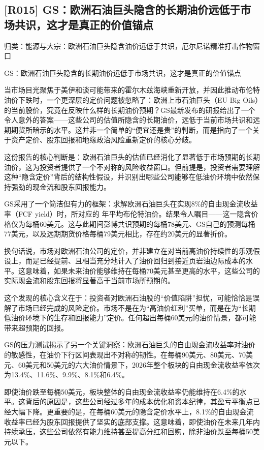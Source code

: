 \documentclass[11pt]{ctexart}
\begin{document}
\subsection{[R015] GS：欧洲石油巨头隐含的长期油价远低于市场共识，这才是真正的价值锚点}
{\small\color{refgray}归类：能源与大宗：欧洲石油巨头隐含油价远低于共识，厄尔尼诺精准打击作物窗口}

GS：欧洲石油巨头隐含的长期油价远低于市场共识，这才是真正的价值锚点

当市场目光聚焦于美伊和谈可能带来的霍尔木兹海峡重新开放，并因此推动布伦特油价下跌时，一个更深层的定价问题被忽略了：欧洲上市石油巨头（EU Big Oils）的当前股价，究竟在反映什么样的长期油价预期？GS最新发布的研报给出了一个令人意外的答案——这些公司的估值所隐含的长期油价，远低于当前市场共识和远期期货所暗示的水平。这并非一个简单的“便宜还是贵”的判断，而是指向了一个关于资产定价、股东回报和地缘政治风险重新定价的核心分歧。

这份报告的核心判断是：欧洲石油巨头的估值已经消化了显著低于市场预期的长期油价，这为投资者提供了一个不对称的风险收益窗口。但前提是，投资者需要理解这种“隐含定价”背后的结构性假设，并识别出哪些公司能够在低油价环境中依然保持强劲的现金流和股东回报能力。

GS采用了一个简洁但有力的框架：求解欧洲石油巨头在实现8\%的自由现金流收益率（FCF yield）时，所对应的 年平均布伦特油价。结果令人瞩目——这一隐含价格仅为每桶60美元。这与此期间彭博共识预期的每桶78美元、GS自己的预测每桶77美元，以及远期期货价格每桶79美元相比，存在约20美元的显著折价。

换句话说，市场对欧洲石油公司的定价，并非建立在对当前高油价持续性的乐观假设上，而是已经提前、且相当充分地计入了油价回归到接近页岩油边际成本的水平。这意味着，如果未来油价能够维持在每桶70美元甚至更高的水平，这些公司的实际现金流和股东回报将显著高于当前市场所预期的。

这个发现的核心含义在于：投资者对欧洲石油股的“价值陷阱”担忧，可能恰恰是误解了市场已经完成的风险定价。市场不是在为“高油价红利”买单，而是在为“长期低油价环境下的生存和回报能力”定价。任何超出每桶60美元的油价情景，都可能带来超预期的回报。

GS的压力测试揭示了另一个关键洞察：欧洲石油巨头的自由现金流收益率对油价的敏感性，在油价下行区间表现出不对称的韧性。在每桶90美元、80美元、70美元、60美元和50美元的六大油价情景下，2026年整个板块的自由现金流收益率依次为13.4\%、11.6\%、9.9\%、8.1\%和6.4\%。

即使油价跌至每桶50美元，板块整体的自由现金流收益率仍能维持在6.4\%的水平。这背后的原因是，这些公司经过多年的成本优化和资本纪律，其盈亏平衡点已经大幅下降。更重要的是，在每桶60美元的隐含定价水平上，8.1\%的自由现金流收益率已经为股东回报提供了坚实的底部支撑。这意味着，即使油价在未来几年内持续承压，这些公司依然有能力维持甚至提高分红和回购，除非油价跌至每桶50美元以下。
\end{document}

